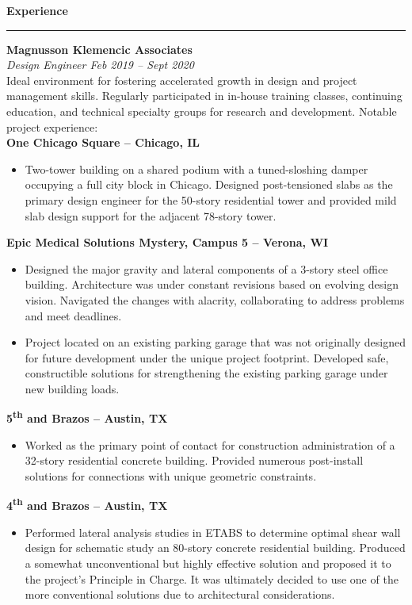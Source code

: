 \documentclass[letterpaper,6pt]{article}
\begin{document}
{\large \textbf{Experience}}
\hrule
\vspace{2mm}
\textbf{Magnusson Klemencic Associates} \\
\textit{Design Engineer \hfill Feb 2019 -- Sept 2020} \\
Ideal environment for fostering accelerated growth in design and project management skills. Regularly participated in in-house training classes, continuing education, and technical specialty groups for research and development. 
Notable project experience: \\
\textbf{\small{One Chicago Square -- Chicago, IL}}
\begin{itemize}[itemsep=0.5mm,topsep=0pt]
    \item  Two-tower building on a shared podium with a tuned-sloshing damper occupying a full city block in Chicago. Designed post-tensioned slabs as the primary design engineer for the 50-story residential tower and provided mild slab design support for the adjacent 78-story tower.
\end{itemize}
\vspace{1mm}
\textbf{\small{Epic Medical Solutions \textbar{} Mystery, Campus 5 -- Verona, WI}}
\begin{itemize}[itemsep=0.5mm,topsep=0pt]
    \item  Designed the major gravity and lateral components of a 3-story steel office building. Architecture was under constant revisions based on evolving design vision. Navigated the changes with alacrity, collaborating to address problems and meet deadlines.
    \item  Project located on an existing parking garage that was not originally designed for future development under the unique project footprint. Developed safe, constructible solutions for strengthening the existing parking garage under new building loads. 
\end{itemize}
\vspace{1mm}
\textbf{\small{5\textsuperscript{th} and Brazos -- Austin, TX}}
\begin{itemize}[itemsep=0.5mm,topsep=0pt]
    \item  Worked as the primary point of contact for construction administration of a 32-story residential concrete building. Provided numerous post-install solutions for connections with unique geometric constraints. 
\end{itemize}
\vspace{1mm}
\textbf{\small{4\textsuperscript{th} and Brazos -- Austin, TX}}
\begin{itemize}[itemsep=0.5mm,topsep=0pt]
    \item  Performed lateral analysis studies in ETABS to determine optimal shear wall design for schematic study an 80-story concrete residential building. Produced a somewhat unconventional but highly effective solution and proposed it to the project's Principle in Charge. It was ultimately decided to use one of the more conventional solutions due to architectural considerations.
\end{itemize}
\end{document}
